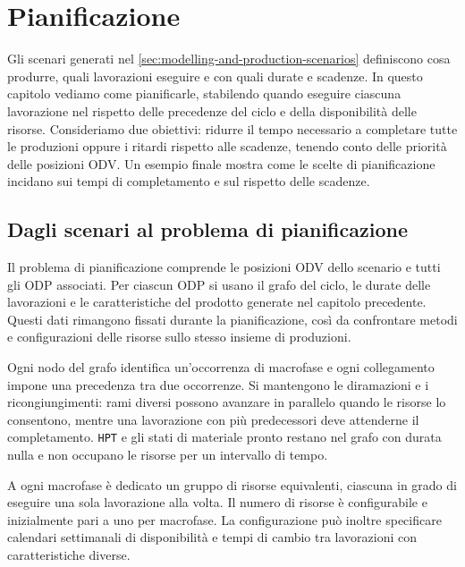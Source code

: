 \chapter{Pianificazione}
\label{sec:scheduling}

Gli scenari generati nel \cref{sec:modelling-and-production-scenarios} definiscono cosa produrre, quali lavorazioni eseguire e con quali durate e scadenze. In questo capitolo vediamo come pianificarle, stabilendo quando eseguire ciascuna lavorazione nel rispetto delle precedenze del ciclo e della disponibilità delle risorse. Consideriamo due obiettivi: ridurre il tempo necessario a completare tutte le produzioni oppure i ritardi rispetto alle scadenze, tenendo conto delle priorità delle posizioni ODV. Un esempio finale mostra come le scelte di pianificazione incidano sui tempi di completamento e sul rispetto delle scadenze.

\section{Dagli scenari al problema di pianificazione}
\label{sec:scheduling-inputs-and-resources}

Il problema di pianificazione comprende le posizioni ODV dello scenario e tutti gli ODP associati. Per ciascun ODP si usano il grafo del ciclo, le durate delle lavorazioni e le caratteristiche del prodotto generate nel capitolo precedente. Questi dati rimangono fissati durante la pianificazione, così da confrontare metodi e configurazioni delle risorse sullo stesso insieme di produzioni.

Ogni nodo del grafo identifica un'occorrenza di macrofase e ogni collegamento impone una precedenza tra due occorrenze. Si mantengono le diramazioni e i ricongiungimenti: rami diversi possono avanzare in parallelo quando le risorse lo consentono, mentre una lavorazione con più predecessori deve attenderne il completamento. \texttt{HPT} e gli stati di materiale pronto restano nel grafo con durata nulla e non occupano le risorse per un intervallo di tempo.

A ogni macrofase è dedicato un gruppo di risorse equivalenti, ciascuna in grado di eseguire una sola lavorazione alla volta. Il numero di risorse è configurabile e inizialmente pari a uno per macrofase. La configurazione può inoltre specificare calendari settimanali di disponibilità e tempi di cambio tra lavorazioni con caratteristiche diverse.

